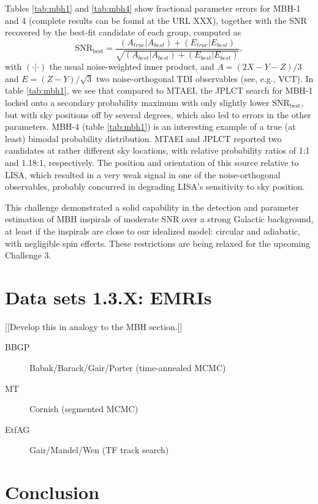 \documentclass{iopart}
\begin{document}
Tables \ref{tab:mbh1} and \ref{tab:mbh4} show fractional parameter errors for MBH-1 and 4 (complete results can be found at the URL XXX), together with the SNR recovered by the best-fit candidate of each group, computed as 
%
\begin{equation}
\mathrm{SNR}_\mathrm{best}  = \frac{(A_{true}|A_{best}) + (E_{true}|E_{best})}
{\sqrt{(A_{best}|A_{best}) + (E_{best}|E_{best})}},
\end{equation}
%
with $(\cdot|\cdot)$ the usual noise-weighted inner product, and $A = (2X - Y - Z)/3$ and $E = (Z-Y)/\sqrt{3}$ two noise-orthogonal TDI observables (see, e.g., VCT). In table \ref{tab:mbh1}, we see that compared to MTAEI, the JPLCT search for MBH-1 locked onto a secondary probability maximum with only slightly lower $\mathrm{SNR}_\mathrm{best}$, but with sky positions off by several degrees, which also led to errors in the other parameters. MBH-4 (table \ref{tab:mbh1}) is an interesting example of a true (at least) bimodal probability distribution. MTAEI and JPLCT reported two candidates at rather different sky locations, with relative probability ratios of 1:1 and 1.18:1, respectively. The position and orientation of this source relative to LISA, which resulted in a very weak signal in one of the noise-orthogonal observables, probably concurred in degrading LISA's sensitivity to sky position.

This challenge demonstrated a solid capability in the detection and parameter estimation of MBH inspirals of moderate SNR over a strong Galactic background, at least if the inspirals are close to our idealized model: circular and adiabatic, with negligible spin effects. These restrictions are being relaxed for the upcoming Challenge 3.

\section{Data sets 1.3.X: EMRIs}

[[Develop this in analogy to the MBH section.]]

\begin{description}
\item[BBGP] Babak/Barack/Gair/Porter (time-annealed MCMC)
\item[MT] Cornish (segmented MCMC)
\item[EtfAG] Gair/Mandel/Wen (TF track search)
\end{description}

\section{Conclusion}
\end{document}
